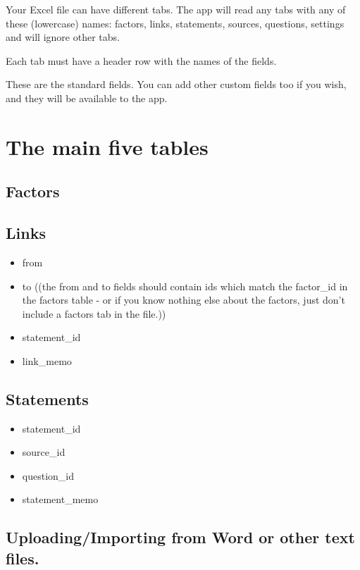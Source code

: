 \documentclass[
]{book}
\providecommand{\tightlist}{%
  \setlength{\itemsep}{0pt}\setlength{\parskip}{0pt}}
\begin{document}
Your Excel file can have different tabs. The app will read any tabs with any of these (lowercase) names: factors, links, statements, sources, questions, settings and will ignore other tabs.

Each tab must have a header row with the names of the fields.

These are the standard fields. You can add other custom fields too if you wish, and they will be available to the app.

\hypertarget{the-main-five-tables}{%
\section{The main five tables}\label{the-main-five-tables}}

\hypertarget{factors-1}{%
\subsection{Factors}\label{factors-1}}

\hypertarget{links-1}{%
\subsection{Links}\label{links-1}}

\begin{itemize}
\tightlist
\item
  from
\item
  to ((the from and to fields should contain ids which match the factor\_id in the factors table - or if you know nothing else about the factors, just don't include a factors tab in the file.))
\item
  statement\_id
\item
  link\_memo
\end{itemize}

\hypertarget{statements-1}{%
\subsection{Statements}\label{statements-1}}

\begin{itemize}
\tightlist
\item
  statement\_id
\item
  source\_id
\item
  question\_id
\item
  statement\_memo
\end{itemize}

\hypertarget{uploadingimporting-from-word-or-other-text-files.-1}{%
\subsection{Uploading/Importing from Word or other text files.}\label{uploadingimporting-from-word-or-other-text-files.-1}}
\end{document}
